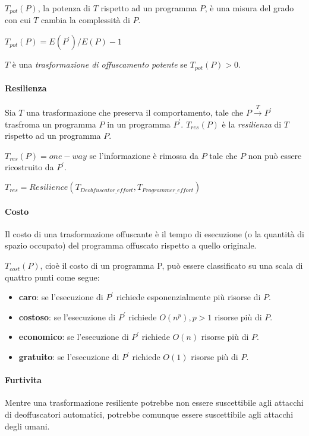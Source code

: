 \documentclass[a4paper,oneside,openright,titlepage,10pt,footinclude,headinclude]{scrbook}
\begin{document}
$T_{pot}(P)$, la potenza di $T$ rispetto ad un programma $P$, è una  misura del grado con cui $T$ cambia la complessità di $P$.

\begin{center}
$T_{pot}(P) = E(P^{'}) / E(P) - 1$
\end{center}
 
 $T$ è una \emph{trasformazione di offuscamento potente} se $T_{pot}(P) > 0$.
 
 \paragraph{Resilienza} 
Sia $T$ una trasformazione che preserva il comportamento, tale che $P \xrightarrow{T} P^{'}$ trasfroma un programma $P$ in un programma $P^{'}$.  $T_{res}(P)$ è la \emph{resilienza} di $T$ rispetto ad un programma $P$. \smallskip

 $T_{res}(P) = one-way$ se l'informazione è rimossa da $P$ tale che $P$ non può essere ricostruito da $P^{'}$. \smallskip

\begin{center}
$T_{res} = Resilience(T_{Deobfuscator\_effort}, T_{Programmer\_effort})$ 
\end{center}


\paragraph{Costo}
Il costo di una trasformazione offuscante è il tempo di esecuzione (o la quantità di spazio occupato) del programma offuscato rispetto a quello originale.\smallskip

\noindent $T_{cost}(P)$, cioè il costo di un programma P, può essere classificato su una scala di quattro punti come segue:
\begin{itemize}
\item
\textbf{caro}: se l'esecuzione di $P^{'}$ richiede esponenzialmente più risorse di $P$.
 \item
\textbf{costoso}: se l'esecuzione di $P^{'}$ richiede $O(n^{p}), p>1$ risorse più di $P$.
 \item
\textbf{economico}: se l'esecuzione di $P^{'}$ richiede $O(n)$ risorse più di $P$.
 \item
\textbf{gratuito}: se l'esecuzione di $P^{'}$ richiede $O(1)$ risorse più di $P$.
\end{itemize}


 \paragraph{Furtivita}
 Mentre una trasformazione resiliente potrebbe non essere suscettibile agli attacchi di deoffuscatori automatici, potrebbe comunque essere suscettibile agli attacchi degli umani.
 
\end{document}
